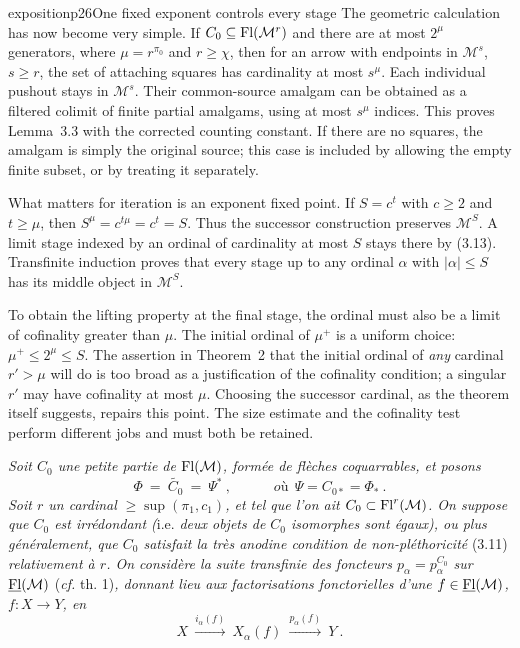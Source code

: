 \begin{dcomment}{exposition}{p26}{One fixed exponent controls every stage}
The geometric calculation has now become very simple. If $C_0\subseteq\mathrm{Fl}(\mathcal M^r)$ and there are at most $2^\mu$ generators, where $\mu=r^{\pi_0}$ and $r\geq\chi$, then for an arrow with endpoints in $\mathcal M^s$, $s\geq r$, the set of attaching squares has cardinality at most $s^\mu$. Each individual pushout stays in $\mathcal M^s$. Their common-source amalgam can be obtained as a filtered colimit of finite partial amalgams, using at most $s^\mu$ indices. This proves Lemma~3.3 with the corrected counting constant. If there are no squares, the amalgam is simply the original source; this case is included by allowing the empty finite subset, or by treating it separately.

What matters for iteration is an exponent fixed point. If $S=c^t$ with $c\geq2$ and $t\geq\mu$, then $S^\mu=c^{t\mu}=c^t=S$. Thus the successor construction preserves $\mathcal M^S$. A limit stage indexed by an ordinal of cardinality at most $S$ stays there by (3.13). Transfinite induction proves that every stage up to any ordinal $\alpha$ with $|\alpha|\leq S$ has its middle object in $\mathcal M^S$.

To obtain the lifting property at the final stage, the ordinal must also be a limit of cofinality greater than $\mu$. The initial ordinal of $\mu^+$ is a uniform choice: $\mu^+\leq2^\mu\leq S$. The assertion in Theorem~2 that the initial ordinal of \emph{any} cardinal $r'>\mu$ will do is too broad as a justification of the cofinality condition; a singular $r'$ may have cofinality at most $\mu$. Choosing the successor cardinal, as the theorem itself suggests, repairs this point. The size estimate and the cofinality test perform different jobs and must both be retained.
\end{dcomment}


\textit{Soit $C_0$ une petite partie de} $\mathrm{Fl}(\mathcal{M})$\textit{, formée de flèches coquarrables, et posons}
\[
\Phi\ =\ \widetilde{C_0}\ =\ \Psi^*\ ,\qquad\quad\textit{où}\ \ \Psi=C_{0*}=\Phi_*\ .
\]
\textit{Soit $r$ un cardinal} $\geq\sup(\pi_1,c_1)$\textit{, et tel que l'on ait $C_0\subset\mathrm{Fl}^r(\mathcal{M})$. On suppose que $C_0$ est irrédondant (}i.e.\textit{ deux objets de $C_0$ isomorphes sont égaux), ou plus généralement, que $C_0$ satisfait la très anodine condition de non-pléthoricité} \textup{(3.11)} \textit{relativement à $r$. On considère la suite transfinie des foncteurs $p_\alpha=p_\alpha^{C_0}$ sur $\underline{\mathrm{Fl}}(\mathcal{M})$} \textup{(}\textit{cf.} \textup{th. 1)}\textit{, donnant lieu aux factorisations fonctorielles d'une $f\in\underline{\mathrm{Fl}}(\mathcal{M})$, $f:X\longrightarrow Y$, en}
\[
X\ \xrightarrow{i_\alpha(f)}\ X_\alpha(f)\ \xrightarrow{p_\alpha(f)}\ Y\ . \tag*{(3.16)}
\]

